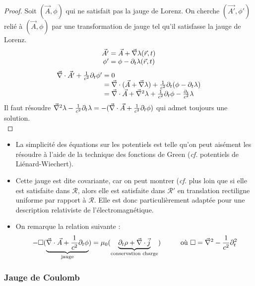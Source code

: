 	\begin{proof}
		Soit $(\vec{A},\phi)$ qui ne satisfait pas la jauge de Lorenz. On cherche $(\vec{A'},\phi')$ relié à $(\vec{A},\phi)$ par une transformation de jauge tel qu'il satisfasse la jauge de Lorenz.\\
$$
		\begin{array}{r@{\;}l}
				\vec{A'} &=\vec{A}+\nab\lambda(\vec{r},t)\\
			\phi'&=\phi-\partial_t\lambda(\vec{r},t)
		\end{array}
$$
$$
		\begin{array}{r@{\;}l}
			\nab\cdot\vec{A'}+\frac{1}{c^2}\partial_t\phi'&=0\\
			&=\nab\cdot(\vec{A}+\nab\lambda)+\frac{1}{c^2}\partial_t(\phi-\partial_t\lambda)\\
			&=\nab\cdot\vec{A}+\nab^2\lambda+\frac{1}{c^2}\partial_t\phi-\frac{\partial_t}{c^2}\lambda
		\end{array}
$$
	Il faut résoudre $\vec{\nabla}^2\lambda-\frac{1}{c^2}\partial_t\lambda=-(\vec{\nabla}\cdot\vec{A}+\frac{1}{c^2}\partial_t\phi)$ qui admet toujours une solution. \\\qedhere
	\end{proof}
	
	
	\begin{remarks} \hspace{1cm}
		\begin{itemize}
			\item La simplicité des équations sur les potentiels est telle qu'on peut aisément les résoudre à l'aide de la technique des fonctions de Green (\emph{cf.} potentiels de Liénard-Wiechert).
			\item Cette jauge est dite covariante, car on peut montrer (\emph{cf.} plus loin que si elle est satisfaite dans $\mathcal{R}$, alors elle est satisfaite dans $\mathcal{R}'$ en translation rectiligne uniforme par rapport à $\mathcal{R}$. Elle est donc particulièrement adaptée pour une description relativiste de l'électromagnétique.
			\item On remarque la relation suivante :
$$
	-\square(\underbrace{\vec{\nabla}\cdot\vec{A}+\frac{1}{c^2}\partial_t\phi}_{\text{jauge}})=\mu_0(\underbrace{\partial_t\rho+\vec{\nabla}\cdot\vec{j}}_{\text{conservation  charge}})\text{\hspace{1cm}où }\square=\vec{\nabla}^2-\frac{1}{c^2}\partial_t^2
$$	 
		\end{itemize}
	\end{remarks}
	
	\subsubsection{Jauge de Coulomb}
	
